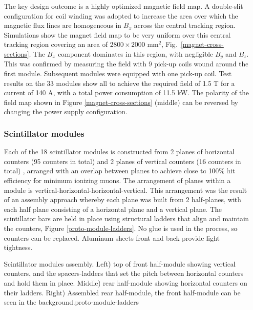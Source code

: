 The key design outcome is a highly optimized magnetic field map. A double-slit configuration for coil winding was adopted to increase the area over which the magnetic flux lines are homogeneous in $B_x$ across the central tracking region. Simulations show the magnet field map to be very uniform over this central tracking region covering an area of $2800\times2000$ mm$^2$, Fig.~\ref{magnet-cross-sections}. The $B_x$ component dominates in this region, with negligible $B_y$ and $B_z$. This was confirmed by measuring the field with 9 pick-up coils wound around the first module. Subsequent modules were equipped with one pick-up coil. Test results on the 33 modules show all to achieve the required field of 1.5 T for a current of 140 A, with a total power consumption of 11.5 kW. The polarity of the field map shown in Figure \ref{magnet-cross-sections} (middle) can be reversed by changing the power supply configuration.

\subsubsection{Scintillator modules}
Each of the 18 scintillator modules is constructed from 2 planes of horizontal counters (95 counters in total) and 2 planes of vertical counters (16 counters in total) \cite{Antonova:2017tuf}, arranged with an overlap between planes to achieve close to 100\% hit efficiency for minimum ionizing muons. The arrangement of planes within a module is vertical-horizontal-horizontal-vertical. This arrangement was the result of an assembly approach whereby each plane was built from 2 half-planes, with each half plane consisting of a horizontal plane and a vertical plane.
The scintillator bars are held in place using structural ladders that align and maintain the counters, Figure \ref{proto-module-ladders}. No glue is used in the process, so counters can be replaced. Aluminum sheets front and back provide light tightness.

 {Scintillator modules assembly. Left) top of front half-module showing vertical counters, and the spacers-ladders that set the pitch between horizontal counters and hold them in place. Middle) rear half-module showing horizontal counters on their ladders. Right) Assembled rear half-module, the front half-module can be seen in the background.}{proto-module-ladders}


